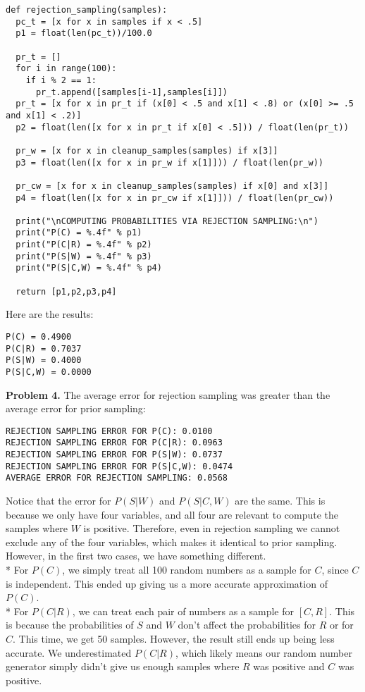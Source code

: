 \documentclass[12pt]{article}
\begin{document}
\begin{verbatim}
def rejection_sampling(samples):
  pc_t = [x for x in samples if x < .5]
  p1 = float(len(pc_t))/100.0

  pr_t = []
  for i in range(100):
    if i % 2 == 1:
      pr_t.append([samples[i-1],samples[i]])
  pr_t = [x for x in pr_t if (x[0] < .5 and x[1] < .8) or (x[0] >= .5 and x[1] < .2)]
  p2 = float(len([x for x in pr_t if x[0] < .5])) / float(len(pr_t))

  pr_w = [x for x in cleanup_samples(samples) if x[3]]
  p3 = float(len([x for x in pr_w if x[1]])) / float(len(pr_w))

  pr_cw = [x for x in cleanup_samples(samples) if x[0] and x[3]]
  p4 = float(len([x for x in pr_cw if x[1]])) / float(len(pr_cw))

  print("\nCOMPUTING PROBABILITIES VIA REJECTION SAMPLING:\n")
  print("P(C) = %.4f" % p1)
  print("P(C|R) = %.4f" % p2)
  print("P(S|W) = %.4f" % p3)
  print("P(S|C,W) = %.4f" % p4)

  return [p1,p2,p3,p4]
\end{verbatim}
Here are the results:
\begin{verbatim}
P(C) = 0.4900
P(C|R) = 0.7037
P(S|W) = 0.4000
P(S|C,W) = 0.0000
\end{verbatim}
\textbf{Problem 4.} The average error for rejection sampling was greater than the average error for prior sampling:
\begin{verbatim}
REJECTION SAMPLING ERROR FOR P(C): 0.0100
REJECTION SAMPLING ERROR FOR P(C|R): 0.0963
REJECTION SAMPLING ERROR FOR P(S|W): 0.0737
REJECTION SAMPLING ERROR FOR P(S|C,W): 0.0474
AVERAGE ERROR FOR REJECTION SAMPLING: 0.0568
\end{verbatim}
Notice that the error for $P(S|W)$ and $P(S|C,W)$ are the same. This is because we only have four variables, and all four are relevant to compute the samples where $W$ is positive. Therefore, even in rejection sampling we cannot exclude any of the four variables, which makes it identical to prior sampling. However, in the first two cases, we have something different.\\*
For $P(C)$, we simply treat all 100 random numbers as a sample for $C$, since $C$ is independent. This ended up giving us a more accurate approximation of $P(C)$.\\*
For $P(C|R)$, we can treat each pair of numbers as a sample for $[C,R]$. This is because the probabilities of $S$ and $W$ don't affect the probabilities for $R$ or for $C$. This time, we get 50 samples. However, the result still ends up being less accurate. We underestimated $P(C|R)$, which likely means our random number generator simply didn't give us enough samples where $R$ was positive and $C$ was positive.
\end{document}
